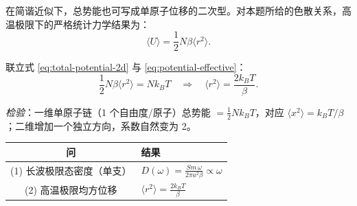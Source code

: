 \begin{derivationbox}[标准解题过程]
在简谐近似下，总势能也可写成单原子位移的二次型。对本题所给的色散关系，高温极限下的严格统计力学结果为：
\begin{equation}
\langle U\rangle = \frac12 N\beta\langle r^2\rangle.
\label{eq:potential-effective}
\end{equation}

联立式 \eqref{eq:total-potential-2d} 与 \eqref{eq:potential-effective}：
\begin{equation}
\frac12 N\beta\langle r^2\rangle = Nk_BT \quad\Longrightarrow\quad \boxed{\langle r^2\rangle = \frac{2k_BT}{\beta}.}
\end{equation}

\textit{检验}：一维单原子链（1 个自由度/原子）总势能 $=\frac12Nk_BT$，对应 $\langle x^2\rangle=k_BT/\beta$；二维增加一个独立方向，系数自然变为 2。
\end{derivationbox}

\begin{formulabox}[答案汇总]
\begin{center}
\begin{tabular}{cl}
\toprule
问 & 结果 \\
\midrule
(1) 长波极限态密度（单支） & $\displaystyle D(\omega) = \frac{Sm\,\omega}{2\pi a^2\beta}\propto\omega$ \\[10pt]
(2) 高温极限均方位移 & $\displaystyle \langle r^2\rangle = \frac{2k_BT}{\beta}$ \\
\bottomrule
\end{tabular}
\end{center}
\end{formulabox}

